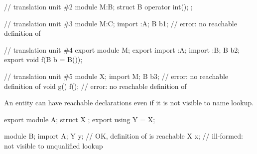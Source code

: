 \begin{std.txt}
\begin{example}
\begin{codeblock}
// translation unit \#2
module M:B;
struct B {
  operator int();
};

// translation unit \#3
module M:C;
import :A;
B b1;                     // error: no reachable definition of 

// translation unit \#4
export module M;
export import :A;
import :B;
B b2;
export void f(B b = B());

// translation unit \#5
module X;
import M;
B b3;                     // error: no reachable definition of 
void g() { f(); }         // error: no reachable definition of 
\end{codeblock}
\end{example}
\exitnote


\pnum
\enternote
An entity can have reachable declarations
even if it is not visible to name lookup.
\exitnote
\begin{example}
\begin{codeblock}
export module A;
struct X {};
export using Y = X;

module B;
import A;
Y y;            // OK, definition of  is reachable
X x;            // ill-formed:  not visible to unqualified lookup
\end{codeblock}
\end{example}
\end{std.txt}
